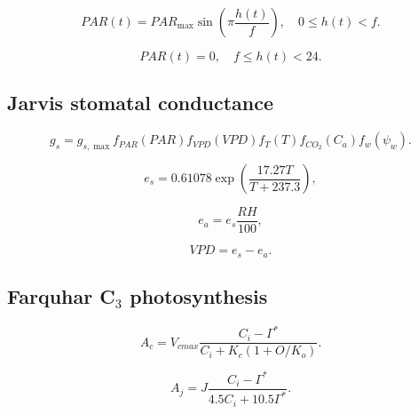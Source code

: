 \documentclass[a4paper,fleqn]{cas-dc}
\begin{document}
\begin{equation}
PAR(t) =
PAR_{\max}
\sin\left(
\pi \frac{h(t)}{f}
\right),
\quad 0 \leq h(t) < f .
\end{equation}

\begin{equation}
PAR(t) = 0, \quad f \leq h(t) < 24 .
\end{equation}


\subsection{Jarvis stomatal conductance}

\begin{equation}
g_s =
g_{s,\max}
f_{PAR}(PAR)
f_{VPD}(VPD)
f_T(T)
f_{CO_2}(C_a)
f_w(\psi_w).
\end{equation}

\begin{equation}
e_s = 0.61078 \exp\left(\frac{17.27T}{T+237.3}\right),
\end{equation}

\begin{equation}
e_a = e_s \frac{RH}{100},
\end{equation}

\begin{equation}
VPD = e_s - e_a.
\end{equation}


\subsection{Farquhar C$_3$ photosynthesis}

\begin{equation}
A_c =
V_{cmax}
\frac{C_i - \Gamma^*}
{C_i + K_c \left(1 + O/K_o\right)} .
\end{equation}

\begin{equation}
A_j =
J
\frac{C_i - \Gamma^*}
{4.5C_i + 10.5\Gamma^*} .
\end{equation}
\end{document}
